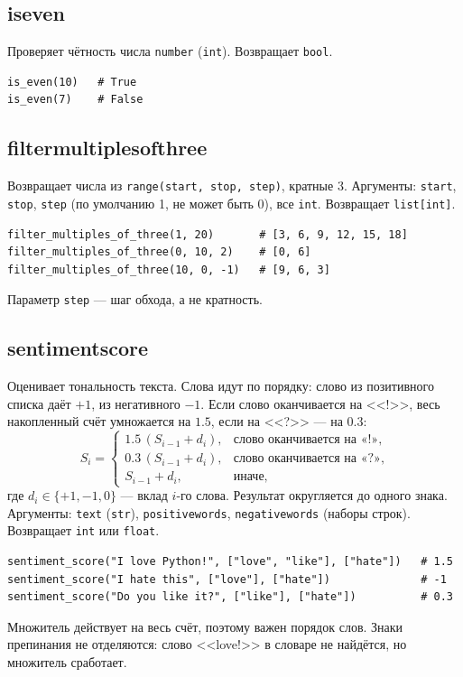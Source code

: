 \documentclass[a4paper,12pt]{article}
\renewcommand{\_}{\oldunderscore\allowbreak}
\begin{document}
\subsection{is\_even}
Проверяет чётность числа \texttt{number} (\texttt{int}). Возвращает \texttt{bool}.
\begin{Verbatim}
is_even(10)   # True
is_even(7)    # False
\end{Verbatim}

\subsection{filter\_multiples\_of\_three}
Возвращает числа из \texttt{range(start, stop, step)}, кратные 3. Аргументы:
\texttt{start}, \texttt{stop}, \texttt{step} (по умолчанию 1, не может быть 0), все
\texttt{int}. Возвращает \texttt{list[int]}.
\begin{Verbatim}
filter_multiples_of_three(1, 20)       # [3, 6, 9, 12, 15, 18]
filter_multiples_of_three(0, 10, 2)    # [0, 6]
filter_multiples_of_three(10, 0, -1)   # [9, 6, 3]
\end{Verbatim}
Параметр \texttt{step} --- шаг обхода, а не кратность.

\subsection{sentiment\_score}
Оценивает тональность текста. Слова идут по порядку: слово из позитивного
списка даёт $+1$, из негативного $-1$. Если слово оканчивается на <<!>>, весь
накопленный счёт умножается на $1.5$, если на <<?>> --- на $0.3$:
\[
  S_{i} =
  \begin{cases}
    1.5\,(S_{i-1} + d_i), & \text{слово оканчивается на «!»},\\
    0.3\,(S_{i-1} + d_i), & \text{слово оканчивается на «?»},\\
    S_{i-1} + d_i, & \text{иначе},
  \end{cases}
\]
где $d_i \in \{+1, -1, 0\}$ --- вклад $i$-го слова. Результат округляется до одного знака.
Аргументы: \texttt{text} (\texttt{str}), \texttt{positive\_words}, \texttt{negative\_words}
(наборы строк). Возвращает \texttt{int} или \texttt{float}.
\begin{Verbatim}
sentiment_score("I love Python!", ["love", "like"], ["hate"])   # 1.5
sentiment_score("I hate this", ["love"], ["hate"])              # -1
sentiment_score("Do you like it?", ["like"], ["hate"])          # 0.3
\end{Verbatim}
Множитель действует на весь счёт, поэтому важен порядок слов. Знаки
препинания не отделяются: слово <<love!>> в словаре не найдётся, но множитель сработает.
\end{document}
